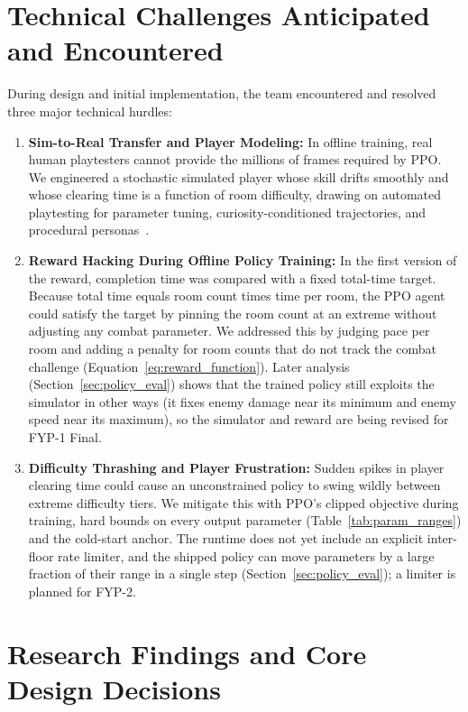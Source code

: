 \section{Technical Challenges Anticipated and Encountered}
During design and initial implementation, the team encountered and resolved three major technical hurdles:
\begin{enumerate}
    \item \textbf{Sim-to-Real Transfer and Player Modeling:} In offline training, real human playtesters cannot provide the millions of frames required by PPO. We engineered a stochastic simulated player whose skill drifts smoothly and whose clearing time is a function of room difficulty, drawing on automated playtesting for parameter tuning, curiosity-conditioned trajectories, and procedural personas~\cite{holmgard2019procedural, zook2014playtesting, sestini2024automated}.
    \item \textbf{Reward Hacking During Offline Policy Training:} In the first version of the reward, completion time was compared with a fixed total-time target. Because total time equals room count times time per room, the PPO agent could satisfy the target by pinning the room count at an extreme without adjusting any combat parameter. We addressed this by judging pace per room and adding a penalty for room counts that do not track the combat challenge (Equation~\ref{eq:reward_function}). Later analysis (Section~\ref{sec:policy_eval}) shows that the trained policy still exploits the simulator in other ways (it fixes enemy damage near its minimum and enemy speed near its maximum), so the simulator and reward are being revised for FYP-1 Final.
    \item \textbf{Difficulty Thrashing and Player Frustration:} Sudden spikes in player clearing time could cause an unconstrained policy to swing wildly between extreme difficulty tiers. We mitigate this with PPO's clipped objective during training, hard bounds on every output parameter (Table~\ref{tab:param_ranges}) and the cold-start anchor. The runtime does not yet include an explicit inter-floor rate limiter, and the shipped policy can move parameters by a large fraction of their range in a single step (Section~\ref{sec:policy_eval}); a limiter is planned for FYP-2.
\end{enumerate}

\section{Research Findings and Core Design Decisions}

